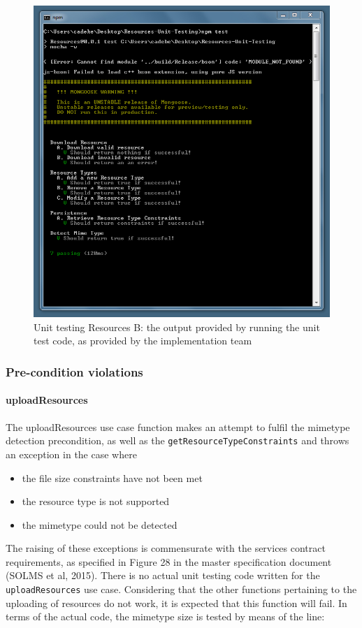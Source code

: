 \documentclass[a4paper]{article}
\begin{document}
\begin{figure}[H]
\includegraphics[width=\textwidth]{Images/test-02.jpg}
\caption{Unit testing Resources B: the output provided by running the unit test code, as provided by the implementation team \label{overflow}}
\end{figure}

\subsubsection {Pre-condition violations}

\paragraph{uploadResources} The uploadResources use case function makes an attempt to fulfil the mimetype detection precondition, as well as the \texttt{getResourceTypeConstraints} and throws an exception in the case where
\begin{itemize}
\item the file size constraints have not been met
\item the resource type is not supported
\item the mimetype could not be detected
\end{itemize}
The raising of these exceptions is commensurate with the services contract requirements, as specified in Figure 28 in the master specification document (SOLMS et al, 2015).
There is no actual unit testing code written for the \texttt{uploadResources} use case. Considering that the other functions pertaining to the uploading of resources do not work, it is expected that this function will fail.
In terms of the actual code, the mimetype size is tested by means of the line:
\end{document}
